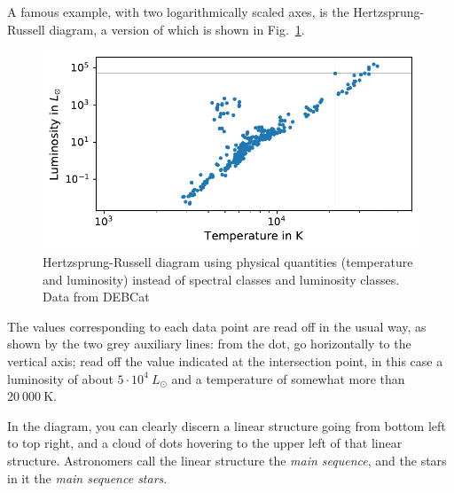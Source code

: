 \documentclass[twocolumn,apj]{openjournal}
\begin{document}
A famous example, with two logarithmically scaled axes, is the Hertzsprung-Russell diagram, a version of which is shown in Fig.~\ref{HRDiagram}.
\begin{figure}[htbp]
\begin{center}
\includegraphics[width=\linewidth]{temp-leuchtkraft-DEB-mono.pdf}
\caption{Hertzsprung-Russell diagram using physical quantities (temperature and luminosity) instead of spectral classes and luminosity classes. Data from DEBCat}
\label{HRDiagram}
\end{center}
\end{figure}
The values corresponding to each data point are read off in the usual way, as shown by the two grey auxiliary lines: from the dot, go horizontally to the vertical axis; read off the value indicated at the intersection point, in this case a luminosity of about $5\cdot 10^4\:L_{\odot}$ and a temperature of somewhat more than $20~000\:\mbox{K}$. 

In the diagram, you can clearly discern a linear structure going from bottom left to top right, and a cloud of dots hovering to the upper left of that linear structure. Astronomers call the linear structure the {\em main sequence}, and the stars in it the {\em main sequence stars}. 
\end{document}
